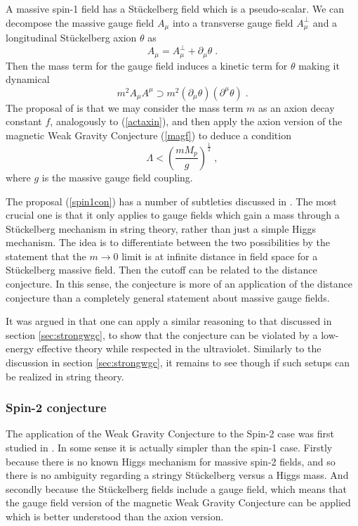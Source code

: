 \documentclass[11pt,a4paper]{article}
\numberwithin{equation}{section}
\numberwithin{table}{section}\setlength{\multlinegap}{25pt}
\newcommand{\be}{\begin{equation}}
\newcommand{\ee}{\end{equation}}
\begin{document}
{A massive spin-1 field has a St\"uckelberg field which is a pseudo-scalar. We can decompose the massive gauge field $A_{\mu}$ into a transverse gauge field $A^{\perp}_{\mu}$ and a longitudinal St\"uckelberg axion $\theta$ as
\be
A_{\mu} = A_{\mu}^{\perp} + \partial_{\mu} \theta \;.
\ee
Then the mass term for the gauge field induces a kinetic term for $\theta$ making it dynamical
\be
m^2 A_{\mu} A^{\mu} \supset m^2 \left(\partial_{\mu} \theta \right)\left(\partial^{\mu} \theta \right) \;.
\ee 
The proposal of \cite{Reece:2018zvv} is that we may consider the mass term $m$ as an axion decay constant $f$, analogously to (\ref{actaxin}), and then apply the axion version of the magnetic Weak Gravity Conjecture (\ref{magf}) to deduce a condition
\be
\Lambda < \left(\frac{mM_p}{g} \right)^{\frac12} \;,
\label{spin1con}
\ee
where $g$ is the massive gauge field coupling. 

The proposal (\ref{spin1con}) has a number of subtleties discussed in \cite{Reece:2018zvv}. The most crucial one is that it only applies to gauge fields which gain a mass through a St\"uckelberg mechanism in string theory, rather than just a simple Higgs mechanism. The idea is to differentiate between the two possibilities by the statement that the $m \rightarrow 0$ limit is at infinite distance in field space for a St\"uckelberg massive field. Then the cutoff can be related to the distance conjecture. In this sense, the conjecture is more of an application of the distance conjecture than a completely general statement about massive gauge fields. 

It was argued in \cite{Craig:2018yld} that one can apply a similar reasoning to that discussed in section \ref{sec:strongwgc}, to show that the conjecture can be violated by a low-energy effective theory while respected in the ultraviolet. Similarly to the discussion in section \ref{sec:strongwgc}, it remains to see though if such setups can be realized in string theory. 

\subsubsection{Spin-2 conjecture}
\label{sec:sp2conj}

The application of the Weak Gravity Conjecture to the Spin-2 case was first studied in \cite{Klaewer:2018yxi}. In some sense it is actually simpler than the spin-1 case. Firstly because there is no known Higgs mechanism for massive spin-2 fields, and so there is no ambiguity regarding a stringy St\"uckelberg versus a Higgs mass. And secondly because the St\"uckelberg fields include a gauge field, which means that the gauge field version of the magnetic Weak Gravity Conjecture can be applied which is better understood than the axion version. 

}
\end{document}
